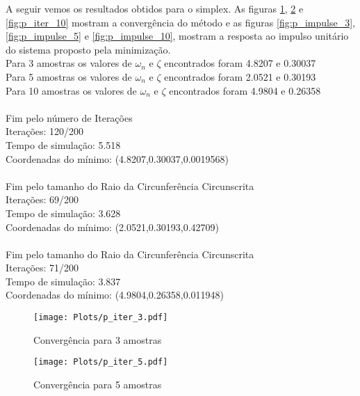 A seguir vemos os resultados obtidos para o simplex. As figuras \ref{fig:p_iter_3}, \ref{fig:p_iter_5} e \ref{fig:p_iter_10} mostram a convergência do método e as figuras \ref{fig:p_impulse_3}, \ref{fig:p_impulse_5} e \ref{fig:p_impulse_10}, mostram a resposta ao impulso unitário do sistema proposto pela minimização.\vspace{10pt}\\
Para 3 amostras os valores de $\omega_n$ e $\zeta$ encontrados foram  4.8207 e 0.30037\\
Para 5 amostras os valores de $\omega_n$ e $\zeta$ encontrados foram  2.0521 e 0.30193\\
Para 10 amostras os valores de $\omega_n$ e $\zeta$ encontrados foram  4.9804 e 0.26358\\\\
Fim pelo número de Iterações\\
Iterações: 120/200\\
Tempo de simulação: 5.518\\
Coordenadas do mínimo: (4.8207,0.30037,0.0019568)\\\\
Fim pelo tamanho do Raio da Circunferência Circunscrita\\
Iterações: 69/200\\
Tempo de simulação: 3.628\\
Coordenadas do mínimo: (2.0521,0.30193,0.42709)\\\\
Fim pelo tamanho do Raio da Circunferência Circunscrita\\
Iterações: 71/200\\
Tempo de simulação: 3.837\\
Coordenadas do mínimo: (4.9804,0.26358,0.011948)\\





\twocolumn
\begin{figure}[H]
	\begin{center}	
		\texttt{[image: Plots/p\_iter\_3.pdf]}
		\caption{Convergência para 3 amostras}
		\label{fig:p_iter_3}
	\end{center}
\end{figure}

\begin{figure}[H]
	\begin{center}	
		\texttt{[image: Plots/p\_iter\_5.pdf]}
		\caption{Convergência para 5 amostras}
		\label{fig:p_iter_5}
	\end{center}
\end{figure}

